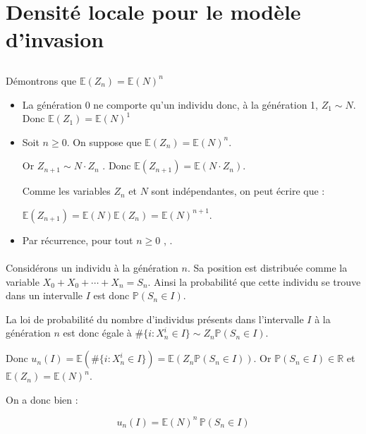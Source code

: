 \documentclass[12pt]{article}
\newcommand{\esp}{\mathbb{E}}
\renewcommand{\P}{\mathbb{P}}
\newcommand{\R}{\mathbb{R}}
\begin{document}
			
	\section{Densité locale pour le modèle d'invasion}
		\subsection{} %
			
			\paragraph{} Démontrons que $\esp(Z_n)=\esp(N)^n$
			\begin{itemize}
			
				\item	La génération 0 ne comporte qu'un individu donc, à la génération 1, $Z_1\sim N$. Donc $\esp(Z_1)=\esp(N)^1$
				
				\item	Soit $n\geqslant 0$. On suppose que $\esp(Z_n)=\esp(N)^n$.
				
						Or $Z_{n+1}\sim N \cdotp Z_n$ . Donc $\esp(Z_{n+1}) = \esp(N \cdotp Z_n)$.
						
						Comme les variables $Z_n$ et $N$ sont indépendantes, on peut écrire que :
						
						$\esp(Z_{n+1}) = \esp(N) \esp( Z_n) = \esp(N)^{n+1}$.
				\item Par récurrence, pour tout $n\geqslant0 $ , \fbox{$\esp(Z_n)=\esp(N)^n$}.
				
			\end{itemize}
	
			\paragraph{}Considérons un individu à la génération $n$. Sa position est distribuée comme la variable $X_0 + X_0 + \cdots + X_n = S_n$. Ainsi la probabilité que cette individu se trouve dans un intervalle $I$ est donc $\P(S_n\in I)$.
			
			La loi de probabilité du nombre d'individus présents dans l'intervalle $I$ à la génération $n$ est donc égale à $\# \{i:X_n^i\in I\} \sim Z_n \P(S_n\in I)$.
			
			Donc $u_n(I)=\esp(\# \{i:X_n^i\in I\})=\esp(Z_n \P(S_n\in I))$. Or $\P(S_n\in I) \in \R$ et $\esp(Z_n)=\esp(N)^n$.
			
			On a donc bien :
			
			\begin{equation}
				\boxed{u_n(I)=\esp(N)^n\,\P(S_n\in I)} \label{resQ21}
			\end{equation}
			
\end{document}

